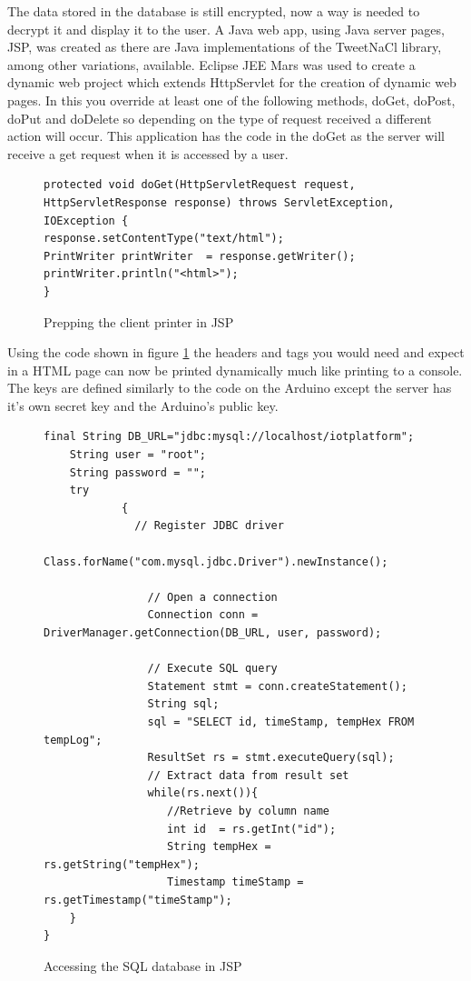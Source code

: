 The data stored in the database is still encrypted, now a way is needed to decrypt it and display it to the user. A Java web app, using Java server pages, JSP, was created as there are Java implementations of the TweetNaCl library, among other variations, available\cite{ian}. Eclipse JEE Mars was used to create a dynamic web project which extends HttpServlet for the creation of dynamic web pages. In this you override at least one of the following methods, doGet, doPost, doPut and doDelete so depending on the type of request received a different action will occur. This application has the code in the doGet as the server will receive a get request when it is accessed by a user.

\begin{figure}[H]
\begin{lstlisting}[style=Java]
protected void doGet(HttpServletRequest request, HttpServletResponse response) throws ServletException, IOException {
response.setContentType("text/html");
PrintWriter printWriter  = response.getWriter();
printWriter.println("<html>");
}
\end{lstlisting}
\caption{Prepping the client printer in JSP}
\label{snip:clientprinterjsp}
\end{figure}

Using the code shown in figure \ref{snip:clientprinterjsp} the headers and tags you would need and expect in a HTML page can now be printed dynamically much like printing to a console. The keys are defined similarly to the code on the Arduino except the server has it's own secret key and the Arduino's public key.

\begin{figure}[H]
\begin{lstlisting}[style=Java]
	final String DB_URL="jdbc:mysql://localhost/iotplatform";
	String user = "root"; 
	String password = "";
	try
	        {
	          // Register JDBC driver
	          Class.forName("com.mysql.jdbc.Driver").newInstance();

	            // Open a connection
	            Connection conn = DriverManager.getConnection(DB_URL, user, password);

	            // Execute SQL query
	            Statement stmt = conn.createStatement();
	            String sql;
	            sql = "SELECT id, timeStamp, tempHex FROM tempLog";
	            ResultSet rs = stmt.executeQuery(sql);
	            // Extract data from result set
	            while(rs.next()){
	               //Retrieve by column name
	               int id  = rs.getInt("id");
	               String tempHex = rs.getString("tempHex");
	               Timestamp timeStamp = rs.getTimestamp("timeStamp");
	}
}
\end{lstlisting}
\caption{Accessing the SQL database in JSP}
\label{snip:jspcode}
\end{figure}

